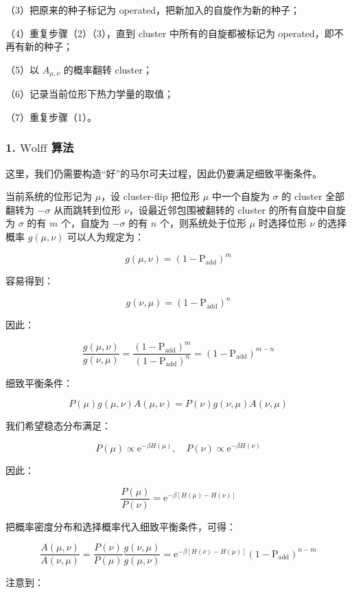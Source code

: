 \documentclass[aps,prl,twocolumn,groupedaddress]{revtex4-2}
\begin{document}
（3）把原来的种子标记为 operated，把新加入的自旋作为新的种子；

（4）重复步骤（2）（3），直到 cluster 中所有的自旋都被标记为 operated，即不再有新的种子；

（5）以 $A_{\mu,\nu} $ 的概率翻转 cluster；

（6）记录当前位形下热力学量的取值；

（7）重复步骤（1）。

\subsubsection{1. $\text{Wolff}$ 算法}

这里，我们仍需要构造“好”的马尔可夫过程，因此仍要满足细致平衡条件。

当前系统的位形记为 $\mu $，设 cluster-flip 把位形 $\mu $ 中一个自旋为 $\sigma $ 的 cluster 全部翻转为 $-\sigma $ 从而跳转到位形 $\nu $，设最近邻包围被翻转的 cluster 的所有自旋中自旋为 $\sigma $ 的有 $m $ 个，自旋为 $-\sigma $ 的有 $n $ 个，则系统处于位形 $\mu $ 时选择位形 $\nu $ 的选择概率 $g(\mu,\nu) $ 可以人为规定为：

$$
g(\mu,\nu) = \left(1-\mathrm{P}_{\mathrm{add}} \right)^m
$$

容易得到：

$$
g(\nu,\mu) = \left(1-\mathrm{P}_{\mathrm{add}} \right)^n
$$

因此：

$$
\frac{g(\mu,\nu) }{g(\nu,\mu) } = \frac{\left(1-\mathrm{P}_{\mathrm{add}} \right)^m }{\left(1-\mathrm{P}_{\mathrm{add}} \right)^n} 
=\left(1-\mathrm{P}_{\mathrm{add}} \right)^{m-n}
$$

细致平衡条件：

$$
P(\mu) g(\mu,\nu) A(\mu,\nu) = P(\nu) g(\nu,\mu) A(\nu,\mu)
$$

我们希望稳态分布满足：

$$
P(\mu) \propto \mathrm{e}^{-\beta H(\mu)},\quad 
P(\nu) \propto \mathrm{e}^{-\beta H(\nu)}
$$

因此：

$$
\frac{P(\mu) }{P(\nu) } = \mathrm{e}^{-\beta \left[H(\mu)-H(\nu) \right]}
$$

把概率密度分布和选择概率代入细致平衡条件，可得：

$$
\frac{A(\mu,\nu) }{A(\nu,\mu) } 
=\frac{P(\nu) }{P(\mu) } \frac{g(\nu,\mu) }{g(\mu,\nu) } 
=\mathrm{e}^{-\beta\left[H(\nu)-H(\mu) \right]} \left(1-\mathrm{P_{add}} \right)^{n-m}
$$

注意到：
\end{document}
